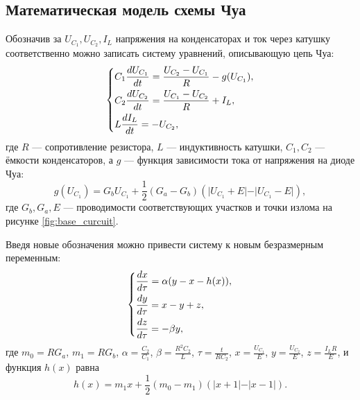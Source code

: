 \documentclass[12pt]{article}
\begin{document}
\subsection*{Математическая модель схемы Чуа}
Обозначив за $U_{C_1}, U_{C_2}, I_{L}$ напряжения на конденсаторах и ток через катушку соответственно можно записать систему уравнений, описывающую цепь Чуа: 
\begin{equation}
	\begin{dcases}
		C_1 \frac{d U_{C_1}}{dt} = \frac{U_{C_2} - U_{C_1}}{R} - g(U_{C_1}), \\
		C_2 \frac{d U_{C_2}}{dt} = \frac{U_{C_1} - U_{C_2}}{R} + I_L, \\ 
		L \frac{d I_L}{dt} = -U_{C_2},
	\end{dcases}
	\label{eq:chua_system}
\end{equation} 
где $R$ --- сопротивление резистора, $L$ --- индуктивность катушки, $C_1, C_2$ --- ёмкости конденсаторов, а $g$ --- функция зависимости тока от напряжения 
на диоде Чуа: 
\[
	g(U_{C_1}) = G_b U_{C_1} + \frac{1}{2} \left( G_a - G_b \right) \left( \vert U_{C_1} + E \vert - \vert U_{C_1} - E \vert \right),
\]
где $G_b, G_a, E$ --- проводимости соответствующих участков и точки излома на рисунке \ref{fig:base_curcuit}.

Введя новые обозначения можно привести систему к новым безразмерным переменным: 
\[
	\begin{dcases}
		\frac{dx}{d \tau} = \alpha(y - x - h(x)), \\
		\frac{dy}{d \tau} = x - y + z, \\
		\frac{dz}{d \tau} = -\beta y, \\
	\end{dcases}
\]
где $m_0 = R G_a$, $m_1 = R G_b$, $\alpha = \frac{C_2}{C_1}$, $\beta = \frac{R^2 C_2}{L}$, 
$\tau = \frac{t}{R C_2}$, $x = \frac{U_{C_1}}{E}$, $y = \frac{U_{C_2}}{E}$, $z = \frac{I_L R}{E}$, и функция $h(x)$ равна 
\[
	h(x) = m_1 x + \frac{1}{2}(m_0 - m_1)(\vert x + 1 \vert - \vert x - 1 \vert ).
\]
\end{document}
